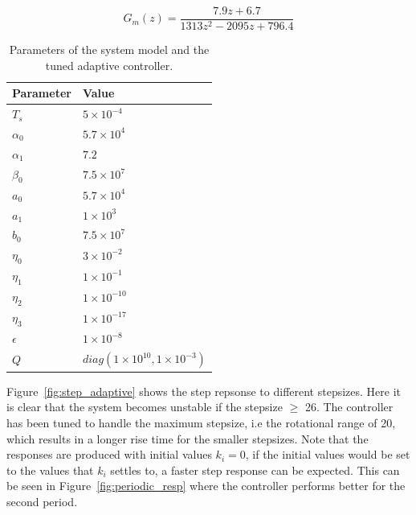 \begin{equation}
  \label{eq:sys_gm}
  G_m(z) = \frac{7.9z + 6.7}{1313z^{2} - 2095z + 796.4}
\end{equation}

\begin{table}[h!]
  \centering
  \begin{tabular}{| l | l |}
    \hline
    Parameter & Value \\ \hline
    $T_s$ & $5 \times 10^{-4}$ \\
    $\alpha_0$ & $5.7 \times 10^{4}$ \\
    $\alpha_1$ & $7.2$ \\
    $\beta_0$ & $7.5 \times 10^{7}$ \\
    $a_0$ & $5.7 \times 10^{4}$ \\
    $a_1$ & $1 \times 10^{3}$ \\
    $b_0$ & $7.5 \times 10^{7}$ \\
    $\eta_0$ & $3 \times 10^{-2}$ \\
    $\eta_1$ & $1 \times 10^{-1}$ \\
    $\eta_2$ & $1 \times 10^{-10}$ \\
    $\eta_3$ & $1 \times 10^{-17}$ \\
    $\epsilon$ & $1 \times 10^{-8}$ \\
    $Q$ & $diag(1 \times 10^{10}, 1 \times 10^{-3})$\\
    \hline
  \end{tabular}
  \caption{\label{tab:adaptive_param} Parameters of the system model and the tuned adaptive controller.}
\end{table}

Figure~\ref{fig:step_adaptive} shows the step repsonse to different stepsizes. Here it is clear that the system becomes unstable if the stepsize $\geq$ \unit{26}{\milli\radian}. The controller has been tuned to handle the maximum stepsize, i.e the rotational range of \unit{20}{\milli\radian}, which results in a longer rise time for the smaller stepsizes. Note that the responses are produced with initial values $k_i = 0$, if the initial values would be set to the values that $k_i$ settles to, a faster step response can be expected. This can be seen in Figure~\ref{fig:periodic_resp} where the controller performs better for the second period.


